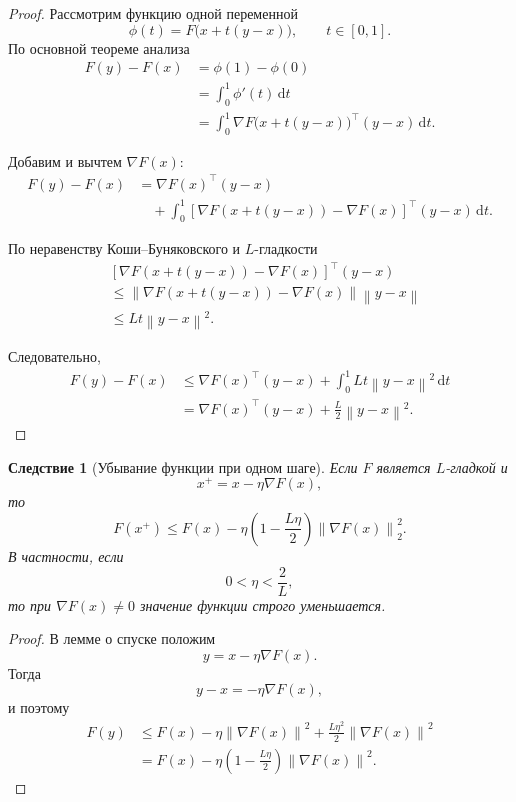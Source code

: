 \documentclass[12pt,a4paper]{article}
\theoremstyle{plain}
\newtheorem{corollary}[theorem]{Следствие}
\theoremstyle{definition}
\theoremstyle{remark}
\newcommand{\norm}[1]{\left\lVert #1 \right\rVert}
\newcommand{\dd}{\,\mathrm{d}}
\begin{document}
\begin{proof}
Рассмотрим функцию одной переменной
\[
    \phi(t)
    =
    F\bigl(x+t(y-x)\bigr),
    \qquad t\in[0,1].
\]
По основной теореме анализа
\[
\begin{aligned}
    F(y)-F(x)
    &=
    \phi(1)-\phi(0)\\
    &=
    \int_0^1\phi'(t)\dd t\\
    &=
    \int_0^1
    \nabla F\bigl(x+t(y-x)\bigr)^\top
    (y-x)\dd t.
\end{aligned}
\]

Добавим и вычтем $\nabla F(x)$:
\[
\begin{aligned}
    F(y)-F(x)
    &=
    \nabla F(x)^\top(y-x)\\
    &\quad+
    \int_0^1
    \left[
        \nabla F(x+t(y-x))-\nabla F(x)
    \right]^\top
    (y-x)\dd t.
\end{aligned}
\]

По неравенству Коши--Буняковского и $L$-гладкости
\[
\begin{aligned}
    &
    \left[
        \nabla F(x+t(y-x))-\nabla F(x)
    \right]^\top
    (y-x)\\
    &\leq
    \norm{
        \nabla F(x+t(y-x))-\nabla F(x)
    }
    \norm{y-x}\\
    &\leq
    Lt\norm{y-x}^2.
\end{aligned}
\]

Следовательно,
\[
\begin{aligned}
    F(y)-F(x)
    &\leq
    \nabla F(x)^\top(y-x)
    +
    \int_0^1Lt\norm{y-x}^2\dd t\\
    &=
    \nabla F(x)^\top(y-x)
    +
    \frac{L}{2}\norm{y-x}^2.
\end{aligned}
\]
\end{proof}

\begin{corollary}[Убывание функции при одном шаге]
Если $F$ является $L$-гладкой и
\[
    x^+=x-\eta\nabla F(x),
\]
то
\[
    F(x^+)
    \leq
    F(x)
    -
    \eta
    \left(
        1-\frac{L\eta}{2}
    \right)
    \norm{\nabla F(x)}_2^2.
\]
В частности, если
\[
    0<\eta<\frac{2}{L},
\]
то при $\nabla F(x)\neq 0$ значение функции строго уменьшается.
\end{corollary}

\begin{proof}
В лемме о спуске положим
\[
    y=x-\eta\nabla F(x).
\]
Тогда
\[
    y-x=-\eta\nabla F(x),
\]
и поэтому
\[
\begin{aligned}
    F(y)
    &\leq
    F(x)
    -
    \eta\norm{\nabla F(x)}^2
    +
    \frac{L\eta^2}{2}
    \norm{\nabla F(x)}^2\\
    &=
    F(x)
    -
    \eta
    \left(
        1-\frac{L\eta}{2}
    \right)
    \norm{\nabla F(x)}^2.
\end{aligned}
\]
\end{proof}
\end{document}
